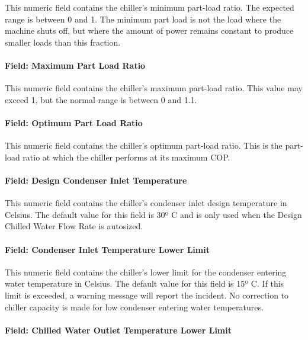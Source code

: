 This numeric field contains the chiller's minimum part-load ratio. The expected range is between 0 and 1. The minimum part load is not the load where the machine shuts off, but where the amount of power remains constant to produce smaller loads than this fraction.

\paragraph{Field: Maximum Part Load Ratio}\label{field-maximum-part-load-ratio-1-001}

This numeric field contains the chiller's maximum part-load ratio. This value may exceed 1, but the normal range is between 0 and 1.1.

\paragraph{Field: Optimum Part Load Ratio}\label{field-optimum-part-load-ratio-1-001}

This numeric field contains the chiller's optimum part-load ratio. This is the part-load ratio at which the chiller performs at its maximum COP.

\paragraph{Field: Design Condenser Inlet Temperature}\label{field-design-condenser-inlet-temperature-1}

This numeric field contains the chiller's condenser inlet design temperature in Celsius. The default value for this field is 30º C and is only used when the Design Chilled Water Flow Rate is autosized.

\paragraph{Field: Condenser Inlet Temperature Lower Limit}\label{field-condenser-inlet-temperature-lower-limit}

This numeric field contains the chiller's lower limit for the condenser entering water temperature in Celsius. The default value for this field is 15º C. If this limit is exceeded, a warning message will report the incident. No correction to chiller capacity is made for low condenser entering water temperatures.

\paragraph{Field: Chilled Water Outlet Temperature Lower Limit}\label{field-chilled-water-outlet-temperature-lower-limit-1}

